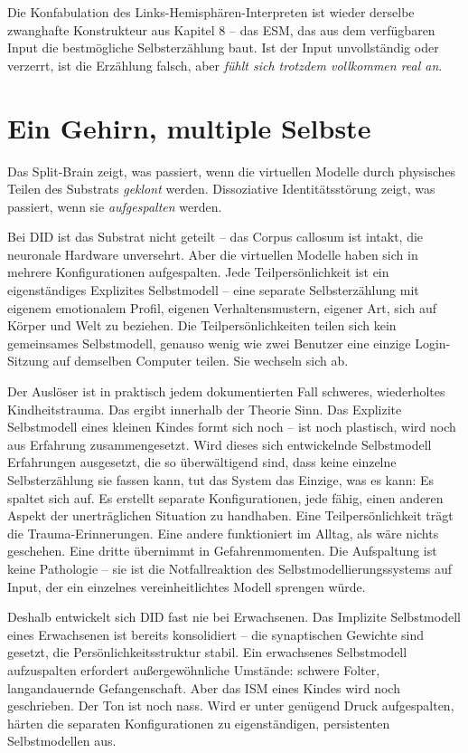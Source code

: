 \documentclass[11pt, twoside, openright]{book}
\begin{document}
Die Konfabulation des Links-Hemisphären-Interpreten ist wieder derselbe zwanghafte Konstrukteur aus Kapitel 8 -- das ESM, das aus dem verfügbaren Input die bestmögliche Selbsterzählung baut. Ist der Input unvollständig oder verzerrt, ist die Erzählung falsch, aber \textit{fühlt sich trotzdem vollkommen real an}.

\section*{Ein Gehirn, multiple Selbste}

Das Split-Brain zeigt, was passiert, wenn die virtuellen Modelle durch physisches Teilen des Substrats \textit{geklont} werden. Dissoziative Identitätsstörung zeigt, was passiert, wenn sie \textit{aufgespalten} werden.

Bei DID ist das Substrat nicht geteilt -- das Corpus callosum ist intakt, die neuronale Hardware unversehrt. Aber die virtuellen Modelle haben sich in mehrere Konfigurationen aufgespalten. Jede Teilpersönlichkeit ist ein eigenständiges Explizites Selbstmodell -- eine separate Selbsterzählung mit eigenem emotionalem Profil, eigenen Verhaltensmustern, eigener Art, sich auf Körper und Welt zu beziehen. Die Teilpersönlichkeiten teilen sich kein gemeinsames Selbstmodell, genauso wenig wie zwei Benutzer eine einzige Login-Sitzung auf demselben Computer teilen. Sie wechseln sich ab.

Der Auslöser ist in praktisch jedem dokumentierten Fall schweres, wiederholtes Kindheitstrauma. Das ergibt innerhalb der Theorie Sinn. Das Explizite Selbstmodell eines kleinen Kindes formt sich noch -- ist noch plastisch, wird noch aus Erfahrung zusammengesetzt. Wird dieses sich entwickelnde Selbstmodell Erfahrungen ausgesetzt, die so überwältigend sind, dass keine einzelne Selbsterzählung sie fassen kann, tut das System das Einzige, was es kann: Es spaltet sich auf. Es erstellt separate Konfigurationen, jede fähig, einen anderen Aspekt der unerträglichen Situation zu handhaben. Eine Teilpersönlichkeit trägt die Trauma-Erinnerungen. Eine andere funktioniert im Alltag, als wäre nichts geschehen. Eine dritte übernimmt in Gefahrenmomenten. Die Aufspaltung ist keine Pathologie -- sie ist die Notfallreaktion des Selbstmodellierungssystems auf Input, der ein einzelnes vereinheitlichtes Modell sprengen würde.

Deshalb entwickelt sich DID fast nie bei Erwachsenen. Das Implizite Selbstmodell eines Erwachsenen ist bereits konsolidiert -- die synaptischen Gewichte sind gesetzt, die Persönlichkeitsstruktur stabil. Ein erwachsenes Selbstmodell aufzuspalten erfordert außergewöhnliche Umstände: schwere Folter, langandauernde Gefangenschaft. Aber das ISM eines Kindes wird noch geschrieben. Der Ton ist noch nass. Wird er unter genügend Druck aufgespalten, härten die separaten Konfigurationen zu eigenständigen, persistenten Selbstmodellen aus.
\end{document}
